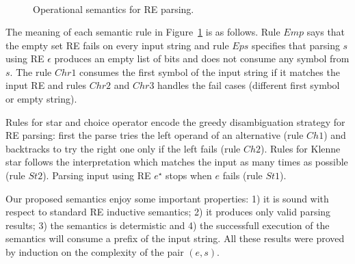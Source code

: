 \documentclass[review]{elsarticle}
\theoremstyle{definition}
\begin{document}
\begin{figure}
\[\begin{array}{ccc}
    \end{array}
  \]
  \caption{Operational semantics for RE parsing.}
  \label{figure:bigstepsemantics}
\end{figure}


The meaning of each semantic rule in Figure~\ref{figure:bigstepsemantics} is as
follows. Rule $Emp$ says that the empty set RE fails on every input string and
rule $Eps$ specifies that parsing $s$ using RE $\epsilon$ produces 
an empty list of bits and does not consume any symbol from $s$. The rule $Chr1$
consumes the first symbol of the input string
if it matches the input RE and rules $Chr2$ and $Chr3$ handles the fail cases
(different first symbol or empty string).

Rules for star and choice operator encode the greedy disambiguation strategy
for RE parsing: first the parse tries the left operand of an alternative (rule
$Ch1$) and backtracks to try the right one only if the left fails (rule $Ch2$).
Rules for Klenne star follows the interpretation which matches the input
as many times as possible (rule $St2$). Parsing input using RE $e^\star$ stops
when $e$ fails (rule $St1$).




Our proposed semantics enjoy some important properties: 1) it is sound with
respect to standard RE inductive semantics; 2) it produces only valid parsing
results; 3) the semantics is determistic and 4) the successfull execution of the
semantics will consume a prefix of the input string. All these results were proved by
induction on the complexity of the pair $(e,s)$.
\end{document}
